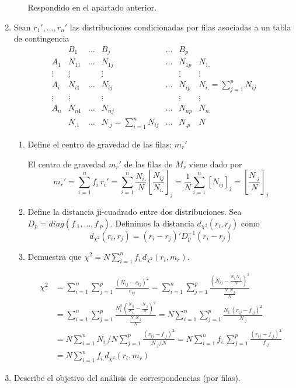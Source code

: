 \documentclass[twoside]{article}
\begin{document}
\begin{enumerate}
\begin{enumerate}
Respondido en el apartado anterior. 
\end{enumerate}
\item Sean $r_1', \dots, r_n'$ las distribuciones condicionadas por filas asociadas a un tabla de contingencia
\[\begin{matrix}
    & B_1    & \dots & B_j    & \dots & B_p\\
A_1 & N_{11} & \dots & N_{1j} & \dots & N_{1p} & N_{1.}\\
\vdots & \vdots & & \vdots & & \vdots & \vdots\\
A_i & N_{i1} & \dots & N_{ij} & \dots & N_{ip} & N_{i.} = \sum_{j=1}^p N_{ij}\\
\vdots & \vdots & & \vdots & & \vdots & \vdots\\
A_n & N_{n1} & \dots & N_{nj} & \dots & N_{np} & N_{n.}\\
    & N_{.1} & \dots & N_{.j} = \sum_{i=1}^n N_{ij} & \dots & N_{.p} & N
\end{matrix}\]
\begin{enumerate}
	\item Define el centro de gravedad de las filas: $m_r'$
	
	El centro de gravedad $m_r'$ de las filas de $M_r$ viene dado por 
	$$
	m_r'=\sum_{i=1}^n f_{i.}r_i' = \sum_{i=1}^n  \frac{N_{i.}}{N}\left[\frac{N_{ij}}{N_{i.}}\right]_j = \frac{1}{N}\sum_{i=1}^n \left[{N_{ij}}\right]_j = \left[\frac{N_{.j}}{N}\right]_{j}
	$$
	\item Define la distancia ji-cuadrado entre dos distribuciones.  
	Sea $D_p = diag(f_{.1},\dotsc,f_{.p})$. Definimos la distancia $d_{\chi^2}(r_i,r_j)$ como
	$$
	d_{\chi^2}(r_i,r_j) = (r_i - r_j)'D_p^{-1}(r_i - r_j)
	$$
	\item Demuestra que $\chi^2 = N\sum_{i=1}^n f_{i.} d_{\chi^2} (r_i, m_r)$. 
	
	
	\begin{align*}
	\chi^2 &= \sum_{i=1}^n \sum_{j=1}^p \frac{(N_{ij}-e_{ij})^2}{e_{ij}} = \sum_{i=1}^n \sum_{j=1}^p \frac{(N_{ij}-\frac{N_{i.}N_{.j}}{N})^2}{\frac{N_{i.}N_{.j}}{N}}\\
	&=  \sum_{i=1}^n \sum_{j=1}^p \frac{N_{i.}^2(\frac{N_{ij}}{N_{i.}}-\frac{N_{.j}}{N})^2}{\frac{N_{i.}N_{.j}}{N}} = N \sum_{i=1}^n \sum_{j=1}^p \frac{N_{i.}(r_{ij}-f_{.j})^2}{N_{.j}}\\
	&= N \sum_{i=1}^n N_{i.}/N\sum_{j=1}^p \frac{(r_{ij}-f_{.j})^2}{N_{.j}/N} = N \sum_{i=1}^n f_{i.}\sum_{j=1}^p \frac{(r_{ij}-f_{.j})^2}{f_{.j}} \\
	&= N\sum_{i=1}^n f_{i.}d_{\chi^2}(r_i,m_r)
	\end{align*}
\end{enumerate}
\item Describe el objetivo del análisis de correspondencias (por filas).


\end{enumerate}
\end{document}
